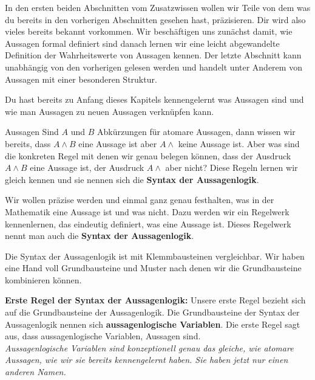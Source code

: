 \documentclass[../../main.tex]{subfiles}
\begin{document}
    
    In den ersten beiden Abschnitten vom Zusatzwissen wollen wir Teile von 
    dem was du bereits in den vorherigen Abschnitten gesehen hast, präzisieren.
    Dir wird also vieles bereits bekannt vorkommen. Wir beschäftigen uns zunächst 
    damit, wie Aussagen formal definiert sind danach lernen wir eine 
    leicht abgewandelte Definition der Wahrheitswerte von Aussagen kennen. 
    Der letzte Abschnitt kann unabhängig
    von den vorherigen gelesen werden und handelt unter Anderem von Aussagen mit einer besonderen Struktur.
    

    Du hast bereits zu Anfang dieses Kapitels kennengelernt was Aussagen sind und wie man Aussagen zu neuen
    Aussagen verknüpfen kann. 
    
    \begin{example}{Aussagen}
        Sind $A$ und $B$ Abkürzungen für atomare Aussagen, dann wissen wir bereits,
        dass $A \land B$ eine Aussage ist aber $A \land $ keine Aussage ist.
        Aber was sind die konkreten Regel mit denen wir genau belegen
        können, dass der Ausdruck $A\land B$ eine Aussage ist,
        der Ausdruck $A \land $ aber nicht? 
        Diese Regeln lernen wir gleich kennen und sie nennen sich 
        die \textbf{Syntax der Aussagenlogik}.
    \end{example}

    Wir wollen präzise werden und einmal ganz
    genau festhalten, was in der Mathematik eine Aussage ist und was nicht.
    Dazu werden wir ein Regelwerk kennenlernen, das eindeutig
    definiert, was eine Aussage ist. Dieses Regelwerk nennt man auch die \textbf{Syntax der
    Aussagenlogik}.

    Die Syntax der Aussagenlogik ist mit Klemmbausteinen vergleichbar. Wir haben 
    eine Hand voll Grundbausteine und Muster nach denen wir die Grundbausteine
    kombinieren können. 

    \textbf{Erste Regel der Syntax der Aussagenlogik:}
    Unsere erste Regel bezieht sich auf die Grundbausteine der Aussagenlogik. Die Grundbausteine
    der Syntax der Aussagenlogik nennen sich \textbf{aussagenlogische Variablen}.
    Die erste Regel sagt aus, dass aussagenlogische Variablen, Aussagen sind.
    \\ \textit{Aussagenlogische Variablen sind konzeptionell genau das gleiche, wie atomare Aussagen,
    wie wir sie bereits kennengelernt haben. Sie haben jetzt nur einen anderen Namen.}
\end{document}
